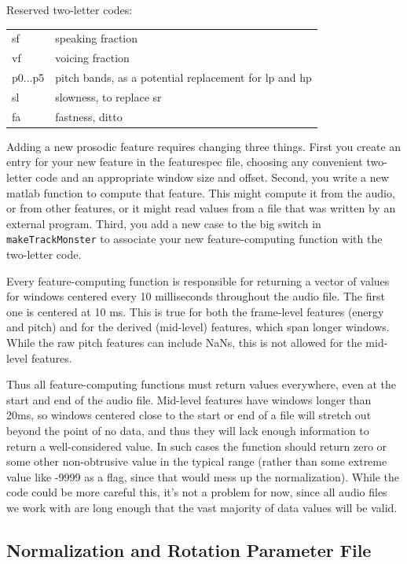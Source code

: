 \documentclass[11pt]{article}
\begin{document}
Reserved two-letter codes: 

\begin{tabular}{ll}  
  sf      & speaking fraction \\
  vf      & voicing fraction \\
  p0...p5 & pitch bands, as a potential replacement for lp and hp  \\
  sl      & slowness, to replace sr \\
  fa      & fastness, ditto\\
\end{tabular}

Adding a new prosodic feature requires changing three things.  First
you create an entry for your new feature in the featurespec file,
choosing any convenient two-letter code and an appropriate window size
and offset.  Second, you write a new matlab function to compute that
feature.  This might compute it from the audio, or from other
features, or it might read values from a file that was written by an
external program.  Third, you add a new case to the big switch in {\tt
  makeTrackMonster} to associate your new feature-computing function
with the two-letter code.

Every feature-computing function is responsible for returning a vector
of values for windows centered every 10 milliseconds throughout the
audio file.  The first one is centered at 10 ms.  This is true for
both the frame-level features (energy and pitch) and for the derived
(mid-level) features, which span longer windows.  While the raw pitch
features can include NaNs, this is not allowed for the mid-level
features.

Thus all feature-computing functions must return values everywhere,
even at the start and end of the audio file.   Mid-level features
have windows longer than 20ms, so windows centered close to the start
or end of a file will stretch out beyond the point of no data, and
thus they will lack enough information to return a well-considered
value.  In such cases the function should return zero or some other
non-obtrusive value in the typical range (rather than some extreme
value like -9999 as a flag, since that would mess up the
normalization).  While the code could be more careful this, it's not a
problem for now, since all audio files we work with are long enough
that the vast majority of data values will be valid.


\subsection{Normalization and Rotation Parameter File}
\end{document}
